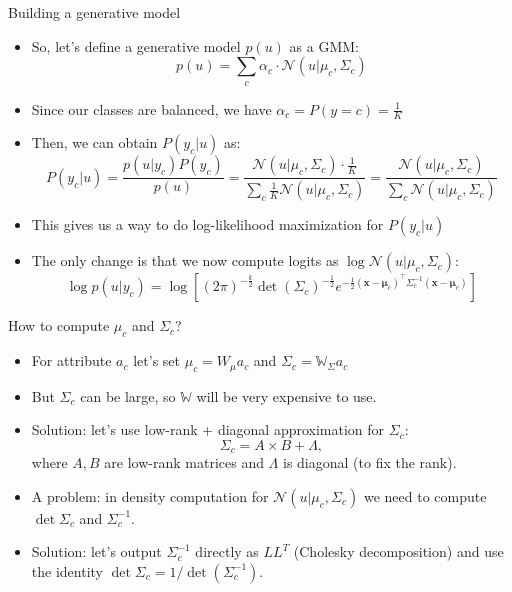\documentclass[handout, 10pt]{beamer}
\begin{document}
\begin{frame}{Building a generative model}
\begin{itemize}
    \item\pause So, let's define a generative model $p(u)$ as a GMM:
    \[
    p(u) = \sum_c \alpha_c \cdot \mathcal{N}(u | \mu_c, \Sigma_c)
    \]
    \item\pause Since our classes are balanced, we have $\alpha_c = P(y=c) = \frac{1}{K}$
    \item\pause Then, we can obtain $P(y_c | u)$ as:
    \[
    P(y_c | u) = \frac{p(u | y_c) P(y_c)}{p(u)} = \frac{\mathcal{N}(u | \mu_c, \Sigma_c) \cdot \frac{1}{K}}{\sum_c \frac{1}{K} \mathcal{N}(u | \mu_c, \Sigma_c)} = \frac{\mathcal{N}(u | \mu_c, \Sigma_c)}{\sum_c \mathcal{N}(u | \mu_c, \Sigma_c)}
    \]
    \item\pause This gives us a way to do log-likelihood maximization for $P(y_c|u)$
    \item\pause The only change is that we now compute logits as $\log \mathcal{N}(u | \mu_c, \Sigma_c)$:
    \[
    \log p(u|y_c) = \log \left[(2 \pi)^{-\frac{k}{2}} \operatorname{det}(\Sigma_c)^{-\frac{1}{2}} e^{-\frac{1}{2}(\mathbf{x}-\boldsymbol{\mu}_c)^{\top} \Sigma_c^{-1}(\mathbf{x}-\boldsymbol{\mu}_c)}\right]
    \]
\end{itemize}
\end{frame}


\begin{frame}{How to compute $\mu_c$ and $\Sigma_c$?}
\begin{itemize}
    \item\pause For attribute $a_c$ let's set $\mu_c = W_{\mu} a_c$ and $\Sigma_c = \mathbb{W}_{\Sigma} a_c$
    \item\pause But $\Sigma_c$ can be large, so $\mathbb{W}$ will be very expensive to use.
    \item\pause Solution: let's use low-rank + diagonal approximation for $\Sigma_c$:
    \[
    \Sigma_c = A\times B + \Lambda,
    \]
    where $A,B$ are low-rank matrices and $\Lambda$ is diagonal (to fix the rank).
    \item\pause A problem: in density computation for $\mathcal{N}(u | \mu_c, \Sigma_c)$ we need to compute $\det \Sigma_c$ and $\Sigma^{-1}_c$.
    \item\pause Solution: let's output $\Sigma^{-1}_c$ directly as $LL^{T}$ (Cholesky decomposition) and use the identity $\det \Sigma_c = 1/\det (\Sigma_c^{-1})$.
\end{itemize}
\end{frame}
\end{document}
